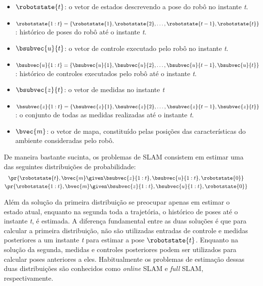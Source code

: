 \begin{itemize}
  \item $\robotstate{t}$: o vetor de estados descrevendo a pose do robô no instante \emph{t}.
  \item $\robotstate{1:t} = \{ \robotstate{1}, \robotstate{2}, \dots, 
  \robotstate{t-1}, \robotstate{t} \}$: histórico de poses do robô até o instante \emph{t}.
  \item $\bsubvec{u}{t}$: o vetor de controle executado pelo robô no instante \emph{t}.
  \item $\bsubvec{u}{1:t} = \{ \bsubvec{u}{1}, \bsubvec{u}{2}, \dots, 
  \bsubvec{u}{t-1}, \bsubvec{u}{t} \}$: histórico de controles executados pelo robô até o instante \emph{t}.
  \item $\bsubvec{z}{t}$: o vetor de medidas no instante \emph{t}
  \item $\bsubvec{z}{1:t} = \{ \bsubvec{z}{1}, \bsubvec{z}{2}, \dots, 
  \bsubvec{z}{t-1}, \bsubvec{z}{t} \}$: o conjunto de todas as medidas realizadas até o instante \emph{t}.
  \item $\bvec{m}$: o vetor de mapa, constituído pelas posições das características do ambiente consideradas pelo robô.
\end{itemize}

De maneira bastante sucinta, os problemas de SLAM consistem em estimar uma das 
seguintes distribuições de probabilidade:
\begin{gather}
  \pr{\robotstate{t}, \bvec{m} \given \bsubvec{z}{1:t} , \bsubvec{u}{1:t}, 
    \robotstate{0}}
  \label{eq:online-slam-probability} \\
  \pr{\robotstate{1:t}, \bvec{m} \given \bsubvec{z}{1:t} , \bsubvec{u}{1:t}, 
    \robotstate{0}}
  \label{eq:full-slam-probability}
\end{gather}

Além da solução da primeira distribuição se preocupar apenas em estimar o 
estado atual, enquanto na segunda toda a trajetória, o histórico de 
poses até o instante \emph{t}, é estimada. A diferença fundamental entre as 
duas soluções é que para calcular a primeira distribuição, não são utilizadas entradas de controle e medidas posteriores a um instante 
\emph{t} para estimar a pose $\robotstate{t}$. Enquanto na 
solução da segunda, medidas e controles posteriores podem ser utilizados para 
calcular poses anteriores a eles. Habitualmente os problemas de estimação 
dessas duas distribuições são conhecidos como \textit{online} SLAM e 
\textit{full} SLAM, respectivamente. 

